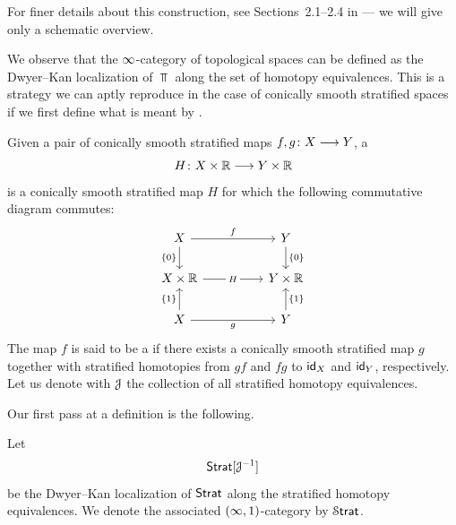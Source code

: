 For finer details about this construction, see Sections~2.1--2.4 in \cite{AFR1} — we will give only a schematic overview. 

We observe that the $\operatorname{\infty}$-category of topological spaces can be defined as the Dwyer--Kan localization of $\Top$ along the set of homotopy equivalences. This is a strategy we can aptly reproduce in the case of conically smooth stratified spaces if we first define what is meant by . 

\begin{definition}\label{ch4:: def: stratified homotopy equivalence}\cite[Definition~2.1.1]{AFR1}
    Given a pair of conically smooth stratified maps $f,g\colon X \longrightarrow Y$, a  
    \begin{equation}
        H \colon X \times \mathbb R \longrightarrow Y \times \mathbb R
    \end{equation}
    is a conically smooth stratified map $H$ for which the following commutative diagram commutes:
    \begin{equation}
        \begin{tikzcd}[ampersand replacement=\&]
            X \&\& Y \\
            {X\times \RR} \&\& {Y \times \RR} \\
            X \&\& Y
            \arrow["f", from=1-1, to=1-3]
            \arrow["{\{0\}}"', from=1-1, to=2-1]
            \arrow["{\{0\}}", from=1-3, to=2-3]
            \arrow["H"{description}, from=2-1, to=2-3]
            \arrow["{\{1\}}", from=3-1, to=2-1]
            \arrow["g"', from=3-1, to=3-3]
            \arrow["{\{1\}}"', from=3-3, to=2-3]
        \end{tikzcd}
    \end{equation}
    The map $f$ is said to be a  if there exists a conically smooth stratified map $g$ together with stratified homotopies from $gf$ and $fg$ to $\operatorname{\sf id}_{X}$ and $\operatorname{\sf id}_{Y}$, respectively. Let us denote with $\mathcal J$ the collection of all stratified homotopy equivalences. 
\end{definition}

Our first pass at a definition is the following.

\begin{definition}
    Let 
    \begin{equation}
    \operatorname{\mathsf{Strat}}[\mathcal J^{-1}]
    \end{equation} 
    be the Dwyer--Kan localization of $\operatorname{\mathsf{Strat}}$ along the stratified homotopy equivalences. We denote the associated $(\operatorname{\infty},1)$-category by $\operatorname{\mathcal S\mathsf{trat}}$.
\end{definition}

